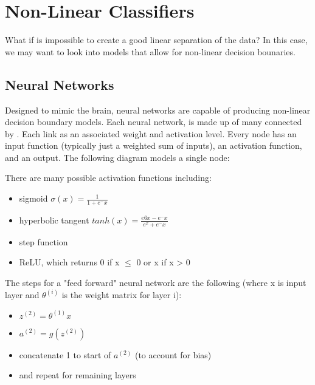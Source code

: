 \chapter{Non-Linear Classifiers}
What if is impossible to create a good linear separation of the data? In this case, we may want to look into models that allow for non-linear decision bounaries.

\begin{center}
\end{center}

\section{Neural Networks}
Designed to mimic the brain, neural networks are capable of producing non-linear decision boundary models. Each neural network, is made up of many  connected by . Each link as an associated weight and activation level. Every node has an input function (typically just a weighted sum of inputs), an activation function, and an output. The following diagram models a single node:

\begin{center}
\end{center}

There are many possible activation functions including:
\begin{itemize}
    \item sigmoid $\sigma(x) = \frac{1}{1 + e^-x}$
    \item hyperbolic tangent $tanh(x) = \frac{e6x-e^-x}{e^x+e^-x}$
    \item step function
    \item ReLU, which returns 0 if x $\leq$ 0 or x if x > 0
\end{itemize}

The steps for a "feed forward" neural network are the following (where x is input layer and $\theta^{(i)}$ is the weight matrix for layer i):
\begin{itemize}
    \item $z^{(2)} = \theta^{(1)}x$
    \item $a^{(2)} = g(z^{(2)})$
    \item concatenate 1 to start of $a^{(2)}$ (to account for bias)
    \item and repeat for remaining layers
\end{itemize}

